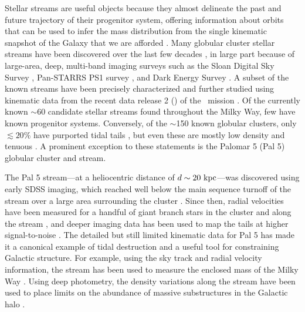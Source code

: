\documentclass[twocolumn]{aastex63}
\begin{document}
Stellar streams are useful objects because they almost \citep[see][]{Sanders:2013} delineate the past and future trajectory of their progenitor system, offering information about orbits that can be used to infer the mass distribution from the single kinematic snapshot of the Galaxy that we are afforded \citep[e.g.,][]{Johnston:1999, Sanders:2013, PriceWhelan:2014, Bonaca:2018, Malhan:2019, Erkal:2019}. %
Many globular cluster stellar streams have been discovered over the last few decades \citep[see, e.g.,][]{Grillmair:2016, Shipp:2018}, in large part because of large-area, deep, multi-band imaging surveys such as the Sloan Digital Sky Survey \citep[SDSS;][]{York:2000}, Pan-STARRS PS1 survey \citep{Chambers:2016}, and Dark Energy Survey \citep{DES:2016}.
A subset of the known streams have been precisely characterized and further studied \citep[e.g.,][]{PriceWhelan:2018, Malhan:2018, Shipp:2019} using kinematic data from the recent data release 2 () of the \Gaia\ mission \citep{Gaia:2016, Gaia:2018}.
Of the currently known $\sim$60 candidate stellar streams found throughout the Milky Way, few have known progenitor systems.
Conversely, of the $\sim$150 known globular clusters, only $\lesssim 20\%$ have purported tidal tails \citep[e.g.,][]{Leon:2000, Kundu:2019}, but even these are mostly low density and tenuous \citep[as might be expected, e.g.,][]{Balbinot:2018}.
A prominent exception to these statements is the Palomar 5 (Pal 5) globular cluster and stream.

The Pal 5 stream---at a heliocentric distance of $d \sim 20~\mathrm{kpc}$---was discovered using early SDSS imaging, which reached well below the main sequence turnoff of the stream over a large area surrounding the cluster \citep{Odenkirchen:2001, Rockosi:2002}.
Since then, radial velocities have been measured for a handful of giant branch stars in the cluster and along the stream \citep{Odenkirchen:2002, Odenkirchen:2009, Ibata:2017}, and deeper imaging data has been used to map the tails at higher signal-to-noise \citep{Bernard:2016, Ibata:2016, Bonaca:2019}.
The detailed but still limited kinematic data for Pal 5 has made it a canonical example of tidal destruction and a useful tool for constraining Galactic structure.
For example, using the sky track and radial velocity information, the stream has been used to measure the enclosed mass of the Milky Way \citep{Kuepper:2015, Bovy:2016}.
Using deep photometry, the density variations along the stream have been used to place limits on the abundance of massive substructures in the Galactic halo \citep{Erkal:2017}.
\end{document}
